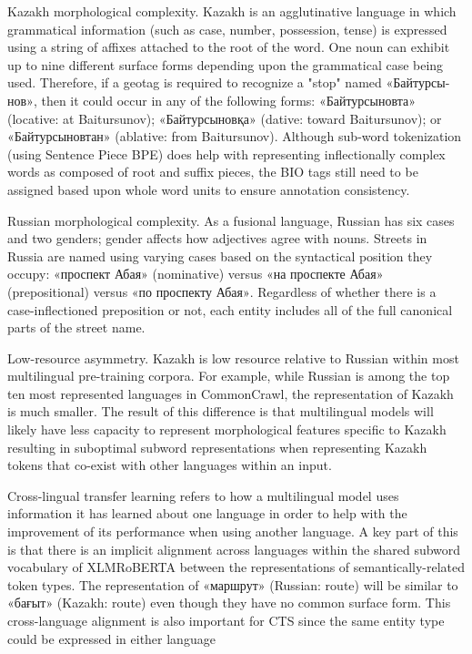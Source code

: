 Kazakh morphological complexity. Kazakh is an agglutinative language in which grammatical information (such as case, number, possession, tense) is expressed using a string of affixes attached to the root of the word. One noun can exhibit up to nine different surface forms depending upon the grammatical case being used. Therefore, if a geotag is required to recognize a "stop" named \foreignlanguage{russian}{«Байтурсынов»}, then it could occur in any of the following forms: \foreignlanguage{russian}{«Байтурсыновта»} (locative: at Baitursunov); \foreignlanguage{russian}{«Байтурсыновқа»} (dative: toward Baitursunov); or \foreignlanguage{russian}{«Байтурсыновтан»} (ablative: from Baitursunov). Although sub-word tokenization (using Sentence Piece BPE) does help with representing inflectionally complex words as composed of root and suffix pieces, the BIO tags still need to be assigned based upon whole word units to ensure annotation consistency.

Russian morphological complexity. As a fusional language, Russian has six cases and two genders; gender affects how adjectives agree with nouns. Streets in Russia are named using varying cases based on the syntactical position they occupy: \foreignlanguage{russian}{«проспект Абая»} (nominative) versus \foreignlanguage{russian}{«на проспекте Абая»} (prepositional) versus \foreignlanguage{russian}{«по проспекту Абая»}. Regardless of whether there is a case-inflectioned preposition or not, each entity includes all of the full canonical parts of the street name.

Low-resource asymmetry. Kazakh is low resource relative to Russian within most multilingual pre-training corpora. For example, while Russian is among the top ten most represented languages in CommonCrawl, the representation of Kazakh is much smaller. The result of this difference is that multilingual models will likely have less capacity to represent morphological features specific to Kazakh resulting in suboptimal subword representations when representing Kazakh tokens that co-exist with other languages within an input.

Cross-lingual transfer learning refers to how a multilingual model uses information it has learned about one language in order to help with the improvement of its performance when using another language. A key part of this is that there is an implicit alignment across languages within the shared subword vocabulary of XLMRoBERTA between the representations of semantically-related token types. The representation of \foreignlanguage{russian}{«маршрут»} (Russian: route) will be similar to \foreignlanguage{russian}{«бағыт»} (Kazakh: route) even though they have no common surface form. This cross-language alignment is also important for CTS since the same entity type could be expressed in either language

